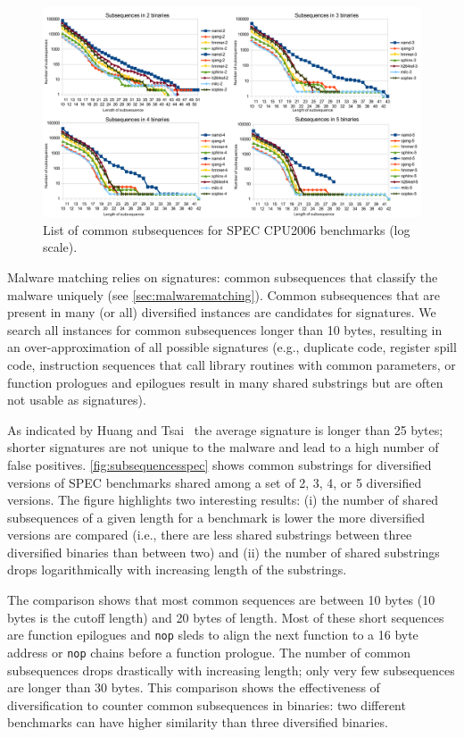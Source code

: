 \documentclass[letterpaper,twocolumn,10pt]{article}
\begin{document}
\begin{figure}[ht!]
 \begin{center}
   \includegraphics[width=160mm]{figures/subsequences-spec}
   \caption{List of common subsequences for SPEC CPU2006 benchmarks (log
     scale).}
   \label{fig:subsequencesspec}
 \end{center}
\end{figure}

Malware matching relies on signatures: common subsequences that classify the
malware uniquely (see \autoref{sec:malwarematching}). Common subsequences that
are present in many (or all) diversified instances are candidates for
signatures. We search all instances for common subsequences longer than 10
bytes, resulting in an over-approximation of all possible signatures (e.g.,
duplicate code, register spill code, instruction sequences that call library
routines with common parameters, or function prologues and epilogues result in
many shared substrings but are often not usable as signatures).

As indicated by Huang and Tsai~\cite{huang10icc} the average signature is longer
than 25 bytes; shorter signatures are not unique to the malware and lead to a
high number of false positives. \autoref{fig:subsequencesspec} shows common
substrings for diversified versions of SPEC benchmarks shared among a
set of 2, 3, 4, or 5 diversified versions. The figure highlights two interesting
results: (i) the number of shared subsequences of a given length for a benchmark
is lower the more diversified versions are compared (i.e., there are less shared
substrings between three diversified binaries than between two) and (ii) the number
of shared substrings drops logarithmically with increasing length of the
substrings.

The comparison shows that most common sequences are between 10 bytes (10 bytes
is the cutoff length) and 20 bytes of length. Most of these short sequences are
function epilogues and \texttt{nop} sleds to align the next function to a 16
byte address or \texttt{nop} chains before a function prologue. The number of
common subsequences drops drastically with increasing length; only very few
subsequences are longer than 30 bytes.  This comparison shows the effectiveness
of diversification to counter common subsequences in binaries: two different
benchmarks can have higher similarity than three diversified binaries.
\end{document}
